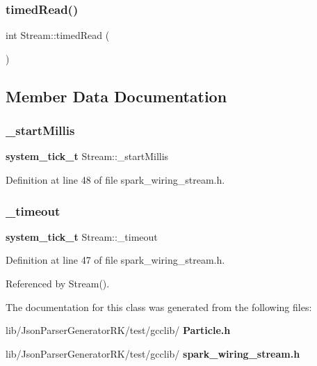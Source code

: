 \mbox{\label{class_stream_a416a0ada5ed3c9d27f1e72c7d73f0aa1}} 
\subsubsection{timed\+Read()}
{\footnotesize\ttfamily int Stream\+::timed\+Read (\begin{DoxyParamCaption}{ }\end{DoxyParamCaption})\hspace{0.3cm}{\ttfamily [protected]}}



\subsection{Member Data Documentation}
\mbox{\label{class_stream_abbead2dae5b725a965860b65fb7f6b34}} 
\subsubsection{\+\_\+start\+Millis}
{\footnotesize\ttfamily \textbf{ system\+\_\+tick\+\_\+t} Stream\+::\+\_\+start\+Millis\hspace{0.3cm}{\ttfamily [protected]}}



Definition at line 48 of file spark\+\_\+wiring\+\_\+stream.\+h.

\mbox{\label{class_stream_ae1fc2b43124fc405406ce18b7e22d48c}} 
\subsubsection{\+\_\+timeout}
{\footnotesize\ttfamily \textbf{ system\+\_\+tick\+\_\+t} Stream\+::\+\_\+timeout\hspace{0.3cm}{\ttfamily [protected]}}



Definition at line 47 of file spark\+\_\+wiring\+\_\+stream.\+h.



Referenced by Stream().



The documentation for this class was generated from the following files\+:\begin{DoxyCompactItemize}
\item 
lib/\+Json\+Parser\+Generator\+R\+K/test/gcclib/\textbf{ Particle.\+h}\item 
lib/\+Json\+Parser\+Generator\+R\+K/test/gcclib/\textbf{ spark\+\_\+wiring\+\_\+stream.\+h}\end{DoxyCompactItemize}
